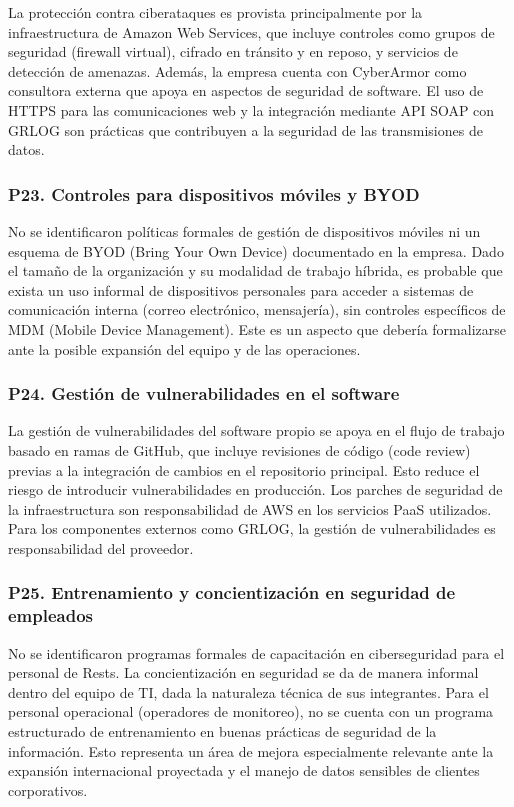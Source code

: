 \documentclass[12pt]{article}
\begin{document}
La protecci\'on contra ciberataques es provista principalmente por la infraestructura de
Amazon Web Services, que incluye controles como grupos de seguridad (firewall virtual),
cifrado en tr\'ansito y en reposo, y servicios de detecci\'on de amenazas. Además,
la empresa cuenta con CyberArmor como consultora externa que apoya en aspectos de
seguridad de software. El uso de HTTPS para las comunicaciones web y la integraci\'on mediante
API SOAP con GRLOG son pr\'acticas que contribuyen a la seguridad de las transmisiones de datos.

\subsubsection*{\textbf{P23. Controles para dispositivos m\'oviles y BYOD}}

No se identificaron pol\'iticas formales de gesti\'on de dispositivos m\'oviles ni un esquema
de BYOD (Bring Your Own Device) documentado en la empresa. Dado el tama\~no de la organizaci\'on
y su modalidad de trabajo h\'ibrida, es probable que exista un uso informal de dispositivos
personales para acceder a sistemas de comunicaci\'on interna (correo electr\'onico, mensajer\'ia),
sin controles espec\'ificos de MDM (Mobile Device Management). Este es un aspecto que deber\'ia
formalizarse ante la posible expansi\'on del equipo y de las operaciones.

\subsubsection*{\textbf{P24. Gesti\'on de vulnerabilidades en el software}}

La gesti\'on de vulnerabilidades del software propio se apoya en el flujo de trabajo basado en
ramas de GitHub, que incluye revisiones de c\'odigo (code review) previas a la integraci\'on
de cambios en el repositorio principal. Esto reduce el riesgo de introducir vulnerabilidades
en producci\'on. Los parches de seguridad de la infraestructura son responsabilidad de AWS en
los servicios PaaS utilizados. Para los componentes externos como GRLOG, la gesti\'on de
vulnerabilidades es responsabilidad del proveedor.

\subsubsection*{\textbf{P25. Entrenamiento y concientizaci\'on en seguridad de empleados}}

No se identificaron programas formales de capacitaci\'on en ciberseguridad para el personal
de Rests. La concientizaci\'on en seguridad se da de manera informal dentro del equipo de TI,
dada la naturaleza t\'ecnica de sus integrantes. Para el personal operacional (operadores de
monitoreo), no se cuenta con un programa estructurado de entrenamiento en buenas pr\'acticas
de seguridad de la informaci\'on. Esto representa un \'area de mejora especialmente relevante
ante la expansi\'on internacional proyectada y el manejo de datos sensibles de clientes
corporativos.
\end{document}
